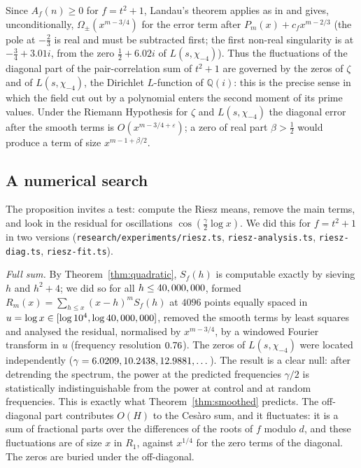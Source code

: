 \documentclass[11pt,a4paper]{article}
\theoremstyle{remark}\newtheorem{remark}[theorem]{Remark}
\newcommand{\Q}{\mathbb{Q}}
\begin{document}
Since $A_f(n)\ge0$ for $f=t^2+1$, Landau's theorem applies as in \cite[Theorem~4]{GoldstonSuriajaya2021} and
gives, unconditionally, $\Omega_\pm(x^{m-3/4})$ for the error term after $P_m(x)+c_fx^{m-2/3}$ (the pole at
$-\tfrac23$ is real and must be subtracted first; the first non-real singularity is at $-\tfrac34+3.01i$,
from the zero $\tfrac12+6.02i$ of $L(s,\chi_{-4})$). Thus the fluctuations of the diagonal
part of the pair-correlation sum of $t^2+1$ are governed by the zeros of $\zeta$ and of $L(s,\chi_{-4})$,
the Dirichlet $L$-function of $\Q(i)$: this is the precise sense in which the field cut out by a
polynomial enters the second moment of its prime values. Under the Riemann Hypothesis for $\zeta$ and
$L(s,\chi_{-4})$ the diagonal error after the smooth terms is $O(x^{m-3/4+\varepsilon})$; a zero of real
part $\beta>\tfrac12$ would produce a term of size $x^{m-1+\beta/2}$.

\subsection{A numerical search}

The proposition invites a test: compute the Riesz means, remove the main terms, and look in the residual for
oscillations $\cos(\tfrac{\gamma}{2}\log x)$. We did this for $f=t^2+1$ in two versions
(\texttt{research/experiments/riesz.ts}, \texttt{riesz-analysis.ts}, \texttt{riesz-diag.ts}, \texttt{riesz-fit.ts}).

\emph{Full sum.} By Theorem~\ref{thm:quadratic}, $S_f(h)$ is computable exactly by sieving $h$ and
$h^2+4$; we did so for all $h\le40,000,000$, formed $R_m(x)=\sum_{h\le x}(x-h)^mS_f(h)$ at $4096$ points
equally spaced in $u=\log x\in[\log10^4,\log40,000,000]$, removed the smooth terms by least squares and
analysed the residual, normalised by $x^{m-3/4}$, by a windowed Fourier transform in $u$ (frequency
resolution $0.76$). The zeros of $L(s,\chi_{-4})$ were located independently
($\gamma=6.0209,10.2438,12.9881,\dots$). The result is a clear null: after detrending the
spectrum, the power at the predicted frequencies $\gamma/2$ is statistically indistinguishable from the
power at control and at random frequencies. This is exactly what Theorem~\ref{thm:smoothed} predicts.
The off-diagonal part contributes $O(H)$ to the Ces\`aro sum, and it fluctuates: it is a sum of
fractional parts over the differences of the roots of $f$ modulo $d$, and these fluctuations are of
size $x$ in $R_1$, against $x^{1/4}$ for the zero terms of the diagonal. The zeros are buried under the
off-diagonal.
\end{document}
